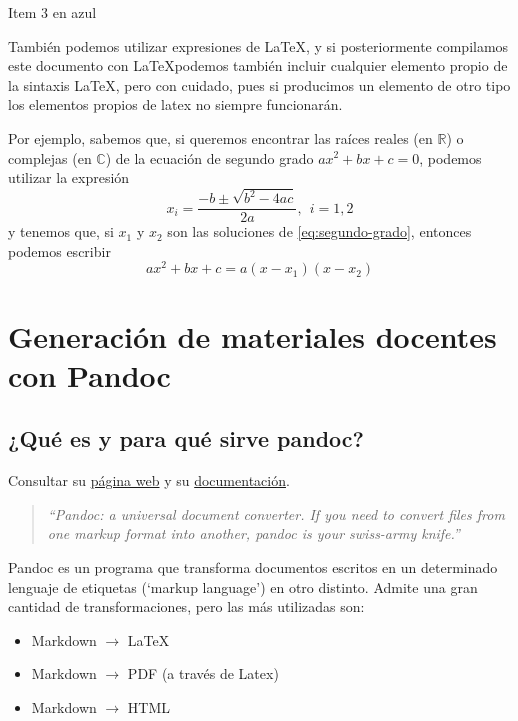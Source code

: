 \documentclass[
  spanish,
]{article}
\providecommand{\tightlist}{%
  \setlength{\itemsep}{0pt}\setlength{\parskip}{0pt}}
\begin{document}
Item 3 en azul

También podemos utilizar expresiones de \LaTeX, y si posteriormente
compilamos este documento con \LaTeX podemos también incluir cualquier
elemento propio de la sintaxis \LaTeX, pero con cuidado, pues si
producimos un elemento de otro tipo los elementos propios de latex no
siempre funcionarán.

Por ejemplo, sabemos que, si queremos encontrar las raíces reales (en
\(\mathbb R\)) o complejas (en \(\mathbb C\)) de la ecuación de segundo
grado \(ax^2 + bx + c = 0\), podemos utilizar la expresión
\begin{equation}
\label{eq:segundo-grado}
x_i = \dfrac{-b \pm \sqrt{b^2-4ac}}{2a}, \ \ i=1,2
\end{equation} y tenemos que, si \(x_1\) y \(x_2\) son las soluciones de
\eqref{eq:segundo-grado}, entonces podemos escribir \[
ax^2 + bx + c = a(x-x_1)(x-x_2)
\]

\section{Generación de materiales docentes con
Pandoc}\label{generaciuxf3n-de-materiales-docentes-con-pandoc}

\subsection{¿Qué es y para qué sirve
pandoc?}\label{quuxe9-es-y-para-quuxe9-sirve-pandoc}

Consultar su \href{https://www.pandoc.org/}{página web} y su
\href{https://pandoc.org/MANUAL.html}{documentación}.

\begin{quote}
\emph{``Pandoc: a universal document converter. If you need to convert
files from one markup format into another, pandoc is your swiss-army
knife.''}
\end{quote}

Pandoc es un programa que transforma documentos escritos en un
determinado lenguaje de etiquetas (`markup language') en otro distinto.
Admite una gran cantidad de transformaciones, pero las más utilizadas
son:

\begin{itemize}
\tightlist
\item
  Markdown \(\rightarrow\) \LaTeX
\item
  Markdown \(\rightarrow\) PDF (a través de Latex)
\item
  Markdown \(\rightarrow\) HTML
\end{itemize}
\end{document}
